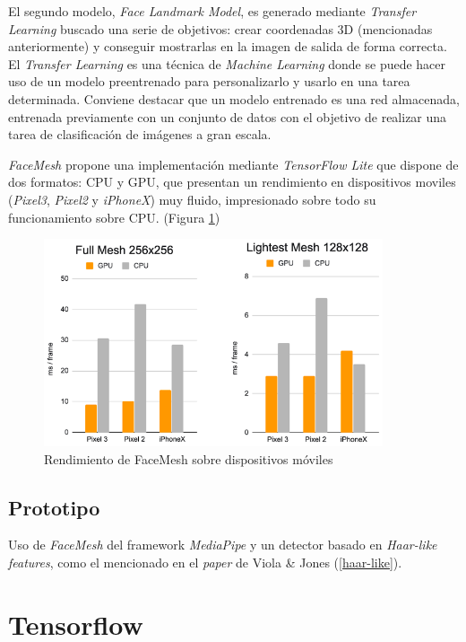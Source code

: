 El segundo modelo, \textit{Face Landmark Model}, es generado mediante \textit{Transfer Learning} buscado una serie de objetivos: crear coordenadas 3D (mencionadas anteriormente) y conseguir mostrarlas en la imagen de salida de forma correcta. \cite{faceMesh} El \textit{Transfer Learning} es una técnica de \textit{Machine Learning} donde se puede hacer uso de un modelo preentrenado para personalizarlo y usarlo en una tarea determinada. Conviene destacar que un modelo entrenado es una red almacenada, entrenada previamente con un conjunto de datos con el objetivo de realizar una tarea de clasificación de imágenes a gran escala. \cite{transferLearning}

\textit{FaceMesh} propone una implementación mediante \textit{TensorFlow Lite} que dispone de dos formatos: CPU y GPU, que presentan un rendimiento en dispositivos moviles (\textit{Pixel3}, \textit{Pixel2} y \textit{iPhoneX}) muy fluido, impresionado sobre todo su funcionamiento sobre CPU. (Figura \ref{fig:faceMeshRen}) \cite{faceMesh3}

\begin{figure}[htp]
	\centering
	\includegraphics[width=10cm]{imagenes/rendFaceMesh.png}
	\caption{Rendimiento de FaceMesh sobre dispositivos móviles}
	\label{fig:faceMeshRen}
\end{figure}

\subsection*{Prototipo}

Uso de \textit{FaceMesh} del framework \textit{MediaPipe} y un detector basado en \textit{Haar-like features}, como el mencionado en el \textit{paper} de Viola \& Jones (\ref{haar-like}).


\newpage
\section{Tensorflow}

